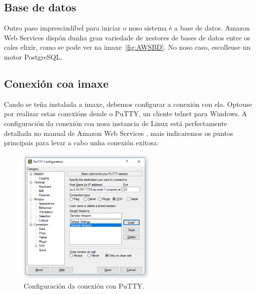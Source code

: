 \subsection{Base de datos}
Outro paso imprescindíbel para iniciar o noso sistema é a base de datos. Amazon Web Services dispón dunha gran variedade de xestores de bases de datos entre os cales elixir, como se pode ver na imaxe~\ref{fig:AWSBD}. No noso caso, escolleuse un motor PostgreSQL.



\subsection{Conexión coa imaxe}
Cando se teña instalada a imaxe, debemos configurar a conexión con ela. Optouse por realizar estas conexións dende o PuTTY, un cliente telnet para Windows. A configuración da conexión coa nosa instancia de Linux está perfectamente detallada no manual de Amazon Web Services \cite{manualAWSPutty}, mais indicaremos os puntos principais para levar a cabo unha conexión exitosa:

\begin{figure}[h]
	\begin{center}
		\includegraphics[width=0.6\textwidth]{figures/capturas/putty}
		\caption{Configuración da conexión con PuTTY.}
		\label{fig:putty}
	\end{center}
\end{figure}


